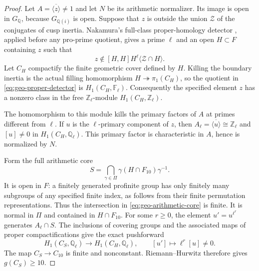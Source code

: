 \begin{proof}
Let \(A=\overline{\langle z\rangle}\neq1\) and let \(N\) be its
arithmetic normalizer.  Its image is open in \(G_{\mathbb Q}\),
because \(G_{\mathbb Q(i)}\) is open.
Suppose that \(z\) is outside the union \(\mathcal Z\) of the
conjugates of cusp inertia.
Nakamura's full-class proper-homology detector
\cite[Lemma 2.1.4, pp.~96--97]{Nakamura1994}, applied before any
pro-prime quotient, gives a prime \(\ell\) and an open
\(H\subset F\) containing \(z\) such that
\begin{equation}\label{eq:geo-proper-detector}
 z\notin[H,H]H^\ell\langle\mathcal Z\cap H\rangle.
\end{equation}
Let \(C_H\) compactify the finite geometric cover defined by \(H\).
Killing the boundary inertia is the actual filling homomorphism
\(H\twoheadrightarrow\pi_1(C_H)\), so the quotient in
\eqref{eq:geo-proper-detector} is
\(H_1(C_H,\mathbb F_\ell)\).
Consequently the specified element \(z\) has a nonzero class
in the free \(\mathbb Z_\ell\)-module \(H_1(C_H,\mathbb Z_\ell)\).

The homomorphism to this module kills the primary factors
of \(A\) at primes different from \(\ell\).
If \(u\) is the \(\ell\)-primary component of \(z\), then
\(A_\ell=\overline{\langle u\rangle}\cong\mathbb Z_\ell\)
and \([u]\neq0\) in \(H_1(C_H,\mathbb Q_\ell)\).
This primary factor is characteristic in \(A\), hence is
normalized by \(N\).

Form the full arithmetic core
\begin{equation}\label{eq:geo-arithmetic-core}
 S=\bigcap_{\gamma\in\Pi}\gamma(H\cap F_{10})\gamma^{-1}.
\end{equation}
It is open in \(F\): a finitely generated profinite group
has only finitely many subgroups of any specified finite index,
as follows from their finite permutation representations.
Thus the intersection in \eqref{eq:geo-arithmetic-core} is finite.
It is normal in \(\Pi\) and contained in \(H\cap F_{10}\).
For some \(r\geq0\), the element \(u'=u^{\ell^r}\) generates
\(A_\ell\cap S\).
The inclusions of covering groups and the associated maps of
proper compactifications give the exact pushforward
\begin{equation}\label{eq:geo-pushforward-class}
 H_1(C_S,\mathbb Q_\ell)\longrightarrow H_1(C_H,\mathbb Q_\ell),
 \qquad [u']\longmapsto\ell^r[u]\neq0.
\end{equation}
The map \(C_S\to C_{10}\) is finite and nonconstant.
Riemann--Hurwitz therefore gives \(g(C_S)\geq10\).


\end{proof}
